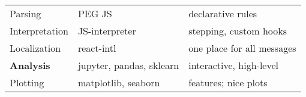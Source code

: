 \begin{center}
\begin{tabular}{l l l}
Parsing & PEG JS & declarative rules \\  %
Interpretation & JS-interpreter & stepping, custom hooks \\
Localization & react-intl & one place for all messages \\
\hline
\textbf{Analysis} & jupyter, pandas, sklearn & interactive, high-level \\
Plotting & matplotlib, seaborn & features; nice plots \\
\bottomrule
\end{tabular}
\end{center}
